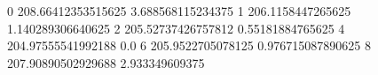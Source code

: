 0 208.66412353515625 3.688568115234375
1 206.1158447265625 1.140289306640625
2 205.52737426757812 0.55181884765625
4 204.97555541992188 0.0
6 205.9522705078125 0.976715087890625
8 207.90890502929688 2.933349609375
